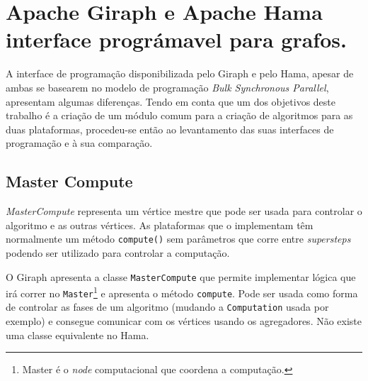 \section{Apache Giraph e Apache Hama interface prográmavel para grafos.}

A interface de programação disponibilizada pelo Giraph e pelo Hama, apesar de 
ambas se basearem no modelo de programação \textit{Bulk Synchronous Parallel}, 
apresentam algumas diferenças. Tendo em conta que um dos objetivos deste 
trabalho é a criação de um módulo comum para a criação de algoritmos para as 
duas plataformas, procedeu-se então ao levantamento das suas interfaces de 
programação e à sua comparação. 

\subsection{Master Compute}
\textit{MasterCompute} representa um vértice mestre que pode ser usada para controlar o algoritmo e as outras vértices. As plataformas que o implementam têm normalmente um método \texttt{compute()} sem parâmetros que corre entre \textit{supersteps} podendo ser utilizado para controlar a computação.


O Giraph apresenta a classe \texttt{MasterCompute} que permite implementar lógica que irá correr no \texttt{Master}\footnote{Master é o \textit{node} computacional que coordena a computação.} e apresenta o método \texttt{compute}. Pode ser usada como forma de controlar as fases de um algoritmo (mudando a \texttt{Computation} usada por exemplo) e consegue comunicar com os vértices usando os agregadores. Não existe uma classe equivalente no Hama.











%
